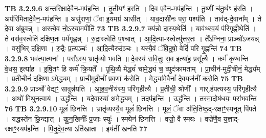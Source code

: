 \documentclass[17pt]{extarticle}
\begin{document}
{{{{{{{{{{{{{{{{{{{                  \newline
                                \textbf{ TB 3.2.9.6} \newline
                  अ॒न्तरि॑क्षादे॒वैन॒-मप॑हन्ति । तृ॒तीयꣳ॑ हरति । दि॒व ए॒वैन॒-मप॑हन्ति । तू॒ष्णीं च॑तु॒र्थꣳ ह॑रति । अप॑रिमितादे॒वैन॒-मप॑हन्ति ॥ असु॑राणां॒ ॅवा इ॒यमग्र॑ आसीत् । याव॒दासी॑नः परा॒ पश्य॑ति । ताव॑द्-दे॒वाना᳚म् । ते दे॒वा अ॑ब्रुवन्न् । अस्त्वे॒व नो॒ऽस्यामपीति॑ \textbf{ 73} \newline
                  \newline
                                \textbf{ TB 3.2.9.7} \newline
                  क्य॑न्नो दास्य॒थेति॑ । याव॑थ्स्व॒यं प॑रिगृह्णी॒थेति॑ । ते वस॑व॒स्त्वेति॑ दक्षिण॒तः पर्य॑गृह्णन्न् । रु॒द्रास्त्वेति॑ प॒श्चात् । आ॒दि॒त्या-स्त्वेत्यु॑त्तर॒तः । ते᳚ऽग्निना॒ प्राञ्चो॑ऽजयन्न् । वसु॑भिर् दक्षि॒णा । रु॒द्रैः प्र॒त्यञ्चः॑ । आ॒दि॒त्यैरुद॑ञ्चः । यस्यै॒वं ॅवि॒दुषो॒ वेदिं॑ परि गृ॒ह्णन्ति॑ \textbf{ 74} \newline
                  \newline
                                \textbf{ TB 3.2.9.8} \newline
                  भव॑त्या॒त्मना᳚ । परा᳚ऽस्य॒ भ्रातृ॑व्यो भवति ॥ दे॒वस्य॑ सवि॒तुः स॒व इत्या॑ह॒ प्रसू᳚त्यै । कर्म॑ कृण्वन्ति वे॒धस॒ इत्या॑ह । इ॒षि॒तꣳ हि कर्म॑ क्रि॒यते᳚ । पृ॒थि॒व्यै मेद्ध्यं॑ चामे॒द्ध्यं च॒ व्युद॑क्रामताम् । प्रा॒चीन॑-मुदी॒चीनं॒ मेद्ध्य᳚म् । प्र॒ती॒चीनं॑ दक्षि॒णा ऽमे॒द्ध्यम् । प्राची॒मुदी॑चीं प्रव॒णां क॑रोति । मेद्ध्या॑मे॒वैनां᳚ देव॒यज॑नीं करोति \textbf{ 75} \newline
                  \newline
                                \textbf{ TB 3.2.9.9} \newline
                  प्राञ्चौ॑ वेद्यꣳ॒॒ सावुन्न॑यति । आ॒ह॒व॒नीय॑स्य॒ परि॑गृहीत्यै । प्र॒तीची॒ श्रोणी᳚ । गार्.ह॑पत्यस्य॒ परि॑गृहीत्यै । अथो॑ मिथुन॒त्वाय॑ । उद्ध॑न्ति । यदे॒वास्या॑ अमे॒द्ध्यम् । तदप॑हन्ति । उद्ध॑न्ति । तस्मा॒दोष॑धयः॒ परा॑भवन्ति \textbf{ 76} \newline
                  \newline
                                \textbf{ TB 3.2.9.10} \newline
                  मूलं॑ छिनत्ति । भ्रातृ॑व्यस्यै॒व मूलं॑ छिनत्ति । मूलं॒ ॅवा अ॑ति॒तिष्ठ॒द्-रक्षाꣳ॒॒स्यनूत् पि॑पते । यद्धस्ते॑न छि॒न्द्यात् । कु॒न॒खिनीः᳚ प्र॒जाः स्युः॑ । स्फ्येन॑ छिनत्ति । वज्रो॒ वै स्फ्यः । वज्रे॑णै॒व य॒ज्ञाद्-रक्षाꣳ॒॒स्यप॑हन्ति । पि॒तृ॒दे॒व॒त्या ऽति॑खाता । इय॑तीं खनति \textbf{ 77} \newline
}}}}}}}}}}}}}}}}}}}
\end{document}
